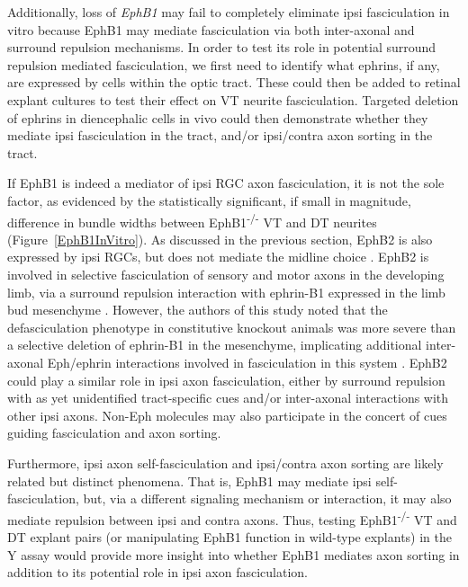 Additionally, loss of \emph{EphB1} may fail to completely eliminate ipsi fasciculation in vitro because EphB1 may mediate fasciculation via both inter-axonal and surround repulsion mechanisms.
In order to test its role in potential surround repulsion mediated fasciculation, we first need to identify what ephrins, if any, are expressed by cells within the optic tract.
These could then be added to retinal explant cultures to test their effect on VT neurite fasciculation.
Targeted deletion of ephrins in diencephalic cells in vivo could then demonstrate whether they mediate ipsi fasciculation in the tract, and/or ipsi/contra axon sorting in the tract.

If EphB1 is indeed a mediator of ipsi RGC axon fasciculation, it is not the sole factor, as evidenced by the statistically significant, if small in magnitude, difference in bundle widths between EphB1\textsuperscript{-/-} VT and DT neurites (Figure~\ref{EphB1InVitro}).
As discussed in the previous section, EphB2 is also expressed by ipsi RGCs, but does not mediate the midline choice \cite{chenaux2011forward,williams2003ephrin}.
EphB2 is involved in selective fasciculation of sensory and motor axons in the developing limb, via a surround repulsion interaction with ephrin-B1 expressed in the limb bud mesenchyme \cite{luxey2013eph}.
However, the authors of this study noted that the defasciculation phenotype in constitutive knockout animals was more severe than a selective deletion of ephrin-B1 in the mesenchyme, implicating additional inter-axonal Eph/ephrin interactions involved in fasciculation in this system \cite{luxey2013eph}.
EphB2 could play a similar role in ipsi axon fasciculation, either by surround repulsion with as yet unidentified tract-specific cues and/or inter-axonal interactions with other ipsi axons.
Non-Eph molecules may also participate in the concert of cues guiding fasciculation and axon sorting.

Furthermore, ipsi axon self-fasciculation and ipsi/contra axon sorting are likely related but distinct phenomena.
That is, EphB1 may mediate ipsi self-fasciculation, but, via a different signaling mechanism or interaction, it may also mediate repulsion between ipsi and contra axons.
Thus, testing EphB1\textsuperscript{-/-} VT and DT explant pairs (or manipulating EphB1 function in wild-type explants) in the Y assay would provide more insight into whether EphB1 mediates axon sorting in addition to its potential role in ipsi axon fasciculation.